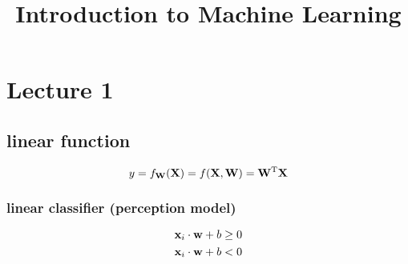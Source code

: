 \documentclass[12pt,a4paper]{article}
\title{Introduction to Machine Learning}
\begin{document}
 

\baselineskip24pt
\maketitle 

\section{Lecture 1}
\subsection*{linear function}
$$
y = f_{\bf W}({\bf X})=f({\bf X,W})={\bf W^{\rm T}X}
$$
\subsubsection*{linear classifier (perception model)}
$$
{\bf x}_i \cdot {\bf w}+b \geq 0
$$
$$
{\bf x}_i \cdot {\bf w}+b < 0
$$
\end{document}

